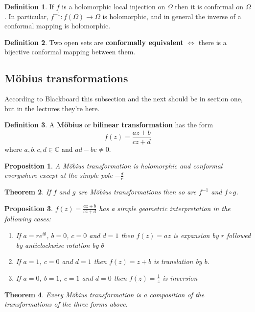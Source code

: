 \documentclass[12pt]{article}
\newtheorem{thm}{Theorem}[section]
\newtheorem{prop}[thm]{Proposition}
\theoremstyle{definition}
\newtheorem{defn}{Definition}[section]
\newcommand{\C}{\mathbb{C}}
\begin{document}
\begin{defn}
  If $f$ is a holomorphic local injection on $\Omega$ then it is conformal on $\Omega$.
  In particular, $f^{-1} : f(\Omega) \to \Omega$ is holomorphic, and in general the inverse of a conformal mapping is holomorphic.
\end{defn}

\begin{defn}
  Two open sets are \textbf{conformally equivalent} $\iff$ there is a bijective conformal mapping between them.
\end{defn}

\subsection{M\"obius transformations}

According to Blackboard this subsection and the next should be in section one, but in the lectures they're here.

\begin{defn}
  A \textbf{M\"obius} or \textbf{bilinear transformation} has the form
  $$f(z) = \frac{az + b}{cz + d}$$
  where $a, b, c, d \in \C$ and $ad - bc \neq 0$.
\end{defn}

\begin{prop}
  A M\"obius transformation is holomorphic and conformal everywhere except at the simple pole $-\frac{d}{c}$
\end{prop}

\begin{thm}
  If $f$ and $g$ are M\"obius transformations then so are $f^{-1}$ and $f \circ g$.
\end{thm}

\begin{prop}
  $f(z) = \frac{az + b}{cz + d}$ has a simple geometric interpretation in the following cases:
  \begin{enumerate}
    \item If $a = re^{i\theta}$, $b = 0$, $c = 0$ and $d = 1$ then $f(z) = az$ is expansion by $r$ followed by anticlockwise rotation by $\theta$
    \item If $a = 1$, $c = 0$ and $d = 1$ then $f(z) = z + b$ is translation by $b$.
    \item If $a = 0$, $b = 1$, $c = 1$ and $d = 0$ then $f(z) = \frac{1}{z}$ is inversion
  \end{enumerate}
\end{prop}

\begin{thm}
  Every M\"obius transformation is a composition of the transformations of the three forms above.
\end{thm}
\end{document}
